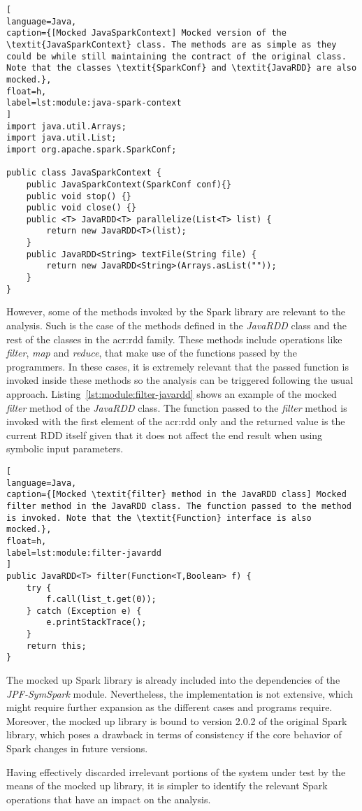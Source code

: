 \begin{lstlisting}[
language=Java,
caption={[Mocked JavaSparkContext] Mocked version of the \textit{JavaSparkContext} class. The methods are as simple as they could be while still maintaining the contract of the original class. Note that the classes \textit{SparkConf} and \textit{JavaRDD} are also mocked.},
float=h,
label=lst:module:java-spark-context
]
import java.util.Arrays;
import java.util.List;
import org.apache.spark.SparkConf;

public class JavaSparkContext {	
	public JavaSparkContext(SparkConf conf){}
	public void stop() {}	
	public void close() {}
	public <T> JavaRDD<T> parallelize(List<T> list) {		
		return new JavaRDD<T>(list);
	}
	public JavaRDD<String> textFile(String file) {
		return new JavaRDD<String>(Arrays.asList(""));
	}
}
\end{lstlisting}

However, some of the methods invoked by the Spark library are relevant to the analysis. Such is the case of the methods defined in the \textit{JavaRDD} class and the rest of the classes in the \acrshort{acr:rdd} family. These methods include operations like \textit{filter}, \textit{map} and \textit{reduce}, that make use of the functions passed by the programmers. In these cases, it is extremely relevant that the passed function is invoked inside these methods so the analysis can be triggered following the usual \spf approach. Listing~\ref{lst:module:filter-javardd} shows an example of the mocked \textit{filter} method of the \textit{JavaRDD} class. The function passed to the \textit{filter} method is invoked with the first element of the \acrshort{acr:rdd} only and the returned value is the current RDD itself given that it does not affect the end result when using symbolic input parameters.

\begin{lstlisting}[
language=Java,
caption={[Mocked \textit{filter} method in the JavaRDD class] Mocked filter method in the JavaRDD class. The function passed to the method is invoked. Note that the \textit{Function} interface is also mocked.},
float=h,
label=lst:module:filter-javardd
]
public JavaRDD<T> filter(Function<T,Boolean> f) {		
	try {
		f.call(list_t.get(0));
	} catch (Exception e) {
		e.printStackTrace();
	}
	return this;
}
\end{lstlisting}

The mocked up Spark library is already included into the dependencies of the \textit{JPF-SymSpark} module. Nevertheless, the implementation is not extensive, which might require further expansion as the different cases and programs require. Moreover, the mocked up library is bound to version 2.0.2 of the original Spark library, which poses a drawback in terms of consistency if the core behavior of Spark changes in future versions.


Having effectively discarded irrelevant portions of the system under test by the means of the mocked up library, it is simpler to identify the relevant Spark operations that have an impact on the analysis.